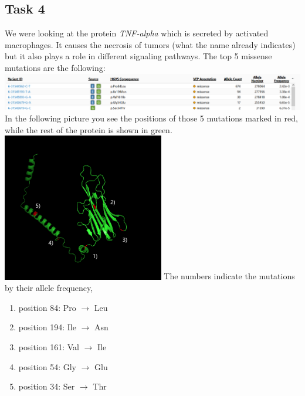 \documentclass[]{article}
\begin{document}
\subsection{Task 4}
We were looking at the protein \textit{TNF-alpha} which is secreted by activated macrophages. It causes the necrosis of tumors (what the name already indicates) but it also plays a role in different signaling pathways.\newline
The top 5 missense mutations are the following:\newline
\includegraphics[height=15ex, width=450pt]{mutations.png}
\newline
\newline
In the following picture you see the positions of those 5 mutations marked in red, while the rest of the protein is shown in green.\newline
\includegraphics[height=40ex, width=200pt]{mutation_3d_small.png}
\newline
\newline
The numbers indicate the mutations by their allele frequency,
\begin{enumerate}[1)]
	\item position 84: Pro $\rightarrow$ Leu
	\item position 194: Ile $\rightarrow$ Asn
	\item position 161: Val $\rightarrow$ Ile
	\item position 54: Gly $\rightarrow$ Glu
	\item position 34: Ser $\rightarrow$ Thr
\end{enumerate}
\end{document}
